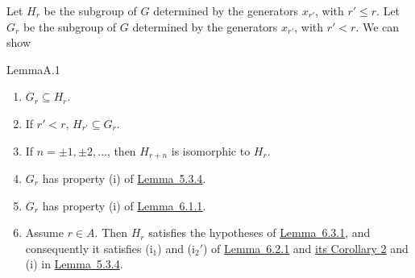 \documentclass[b5paper,twoside]{article}
\newcommand{\lemref}[2]{\hyperref[#1]{\mbox{Lemma~#2}}}
\theoremstyle{mvnplain}
\def\mathfrak#1{#1}%
\begin{document}
Let $\mathfrak H_r$ be the subgroup of $\mathfrak G$ determined by
the generators $x_{r'}$, with $r'\leq r$. Let $\mathfrak G_r$ be the subgroup
of $\mathfrak G$ determined by the generators $x_{r'}$, with $r'<r$. We can
show
\begin{namedstatement}{Lemma}{A.1}\label{lem:A.1}
\begin{enumerate}[label=(\roman*),leftmargin=3em]
\item $\mathfrak G_r\subseteq\mathfrak H_r$.
\item If $r'<r$, $\mathfrak H_{r'}\subseteq\mathfrak G_r$.
\item If $n=\pm1,\pm2,\ldots$, then
$\mathfrak H_{r+n}$ is isomorphic to $\mathfrak H_r$.
\item $\mathfrak G_r$ has property (i) of \lemref{lem:5.3.4}{5.3.4}.
\item $\mathfrak G_r$ has property (i) of \lemref{lem:6.1.1}{6.1.1}.
\item Assume $r\in A$. Then $\mathfrak H_r$ satisfies the
  hypotheses of \lemref{lem:6.3.1}{6.3.1}, and consequently it satisfies
  (i$_1$) and (i$_2'$) of \lemref{lem:6.2.1}{6.2.1} and
  \hyperref[cor:6.2.2]{its Corollary 2} and (i)
in \lemref{lem:5.3.4}{5.3.4}.
\end{enumerate}
\end{namedstatement}
\end{document}

